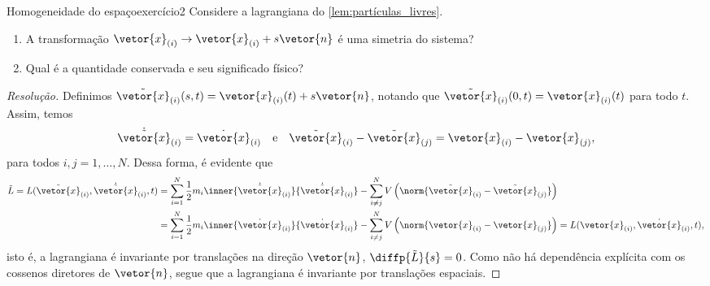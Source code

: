 \begin{exercício}[code={\setcounter{tcb@cnt@exercício}{1}}]{Homogeneidade do espaço}{exercício2}
    Considere a lagrangiana do \cref{lem:partículas_livres}.
    \begin{enumerate}[label=(\alph*)]
        \item A transformação \(\vetor{x}_{(i)} \to \vetor{x}_{(i)} + s\vetor{n}\) é uma simetria do sistema?
        \item Qual é a quantidade conservada e seu significado físico?
    \end{enumerate}
\end{exercício}
\begin{proof}[Resolução]
    Definimos \(\tilde{\vetor{x}}_{(i)}(s,t) = \vetor{x}_{(i)}(t) + s\vetor{n}\), notando que \(\tilde{\vetor{x}}_{(i)}(0,t) = \vetor{x}_{(i)}(t)\) para todo \(t\). Assim, temos
    \begin{equation*}
        \dot{\tilde{\vetor{x}}}_{(i)} = \dot{\vetor{x}}_{(i)}\quad\text{e}\quad\tilde{\vetor{x}}_{(i)} - \tilde{\vetor{x}}_{(j)} = \vetor{x}_{(i)} - \vetor{x}_{(j)},
    \end{equation*}
    para todos \(i, j = 1, \dots, N.\) Dessa forma, é evidente que
    \begin{align*}
        \tilde{L} = L(\tilde{\vetor{x}}_{(i)}, \dot{\tilde{\vetor{x}}}_{(i)}, t) &= \sum_{i = 1}^N \frac12 m_i \inner{\dot{\tilde{\vetor{x}}}_{(i)}}{\dot{\tilde{\vetor{x}}}_{(i)}} - \sum_{i\neq j}^{N} V\left(\norm{\tilde{\vetor{x}}_{(i)} - \tilde{\vetor{x}}_{(j)}}\right)\\
                                                                                 &= \sum_{i = 1}^N \frac12 m_i \inner{\dot{{\vetor{x}}}_{(i)}}{\dot{{\vetor{x}}}_{(i)}} - \sum_{i\neq j}^{N} V\left(\norm{{\vetor{x}}_{(i)} - {\vetor{x}}_{(j)}}\right) = L(\vetor{x}_{(i)}, \dot{\vetor{x}}_{(i)}, t),
    \end{align*}
    isto é, a lagrangiana é invariante por translações na direção \(\vetor{n}\), \(\diffp{\tilde{L}}{s} = 0\). Como não há dependência explícita com os cossenos diretores de \(\vetor{n}\), segue que a lagrangiana é invariante por translações espaciais.


\end{proof}
